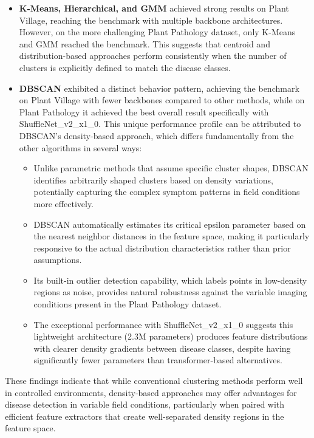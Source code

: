 \documentclass[12pt,a4paper,oneside]{report}
\begin{document}
\begin{itemize}
    \item \textbf{K-Means, Hierarchical, and GMM} achieved strong results on Plant Village, reaching the benchmark with multiple backbone architectures. However, on the more challenging Plant Pathology dataset, only K-Means and GMM reached the benchmark. This suggests that centroid and distribution-based approaches perform consistently when the number of clusters is explicitly defined to match the disease classes.
    
    \item \textbf{DBSCAN} exhibited a distinct behavior pattern, achieving the benchmark on Plant Village with fewer backbones compared to other methods, while on Plant Pathology it achieved the best overall result specifically with ShuffleNet\_v2\_x1\_0. This unique performance profile can be attributed to DBSCAN's density-based approach, which differs fundamentally from the other algorithms in several ways:
    \begin{itemize}
        \item Unlike parametric methods that assume specific cluster shapes, DBSCAN identifies arbitrarily shaped clusters based on density variations, potentially capturing the complex symptom patterns in field conditions more effectively.
        
        \item DBSCAN automatically estimates its critical epsilon parameter based on the nearest neighbor distances in the feature space, making it particularly responsive to the actual distribution characteristics rather than prior assumptions.
        
        \item Its built-in outlier detection capability, which labels points in low-density regions as noise, provides natural robustness against the variable imaging conditions present in the Plant Pathology dataset.
        
        \item The exceptional performance with ShuffleNet\_v2\_x1\_0 suggests this lightweight architecture (2.3M parameters) produces feature distributions with clearer density gradients between disease classes, despite having significantly fewer parameters than transformer-based alternatives.
    \end{itemize}
\end{itemize}

These findings indicate that while conventional clustering methods perform well in controlled environments, density-based approaches may offer advantages for disease detection in variable field conditions, particularly when paired with efficient feature extractors that create well-separated density regions in the feature space.
\end{document}
